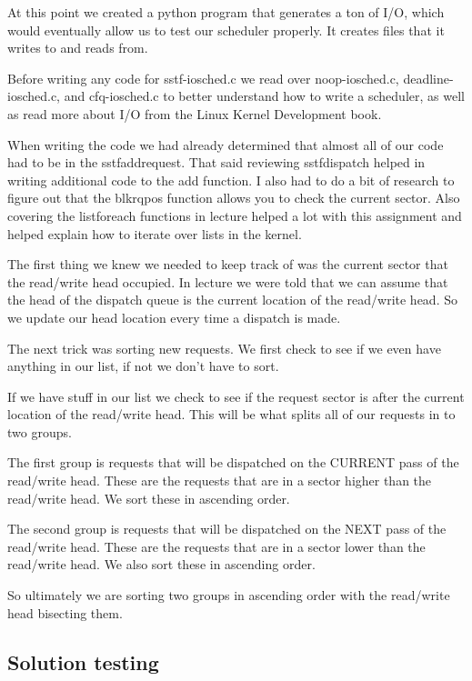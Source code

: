 \documentclass[journal,10pt,onecolumn,letterpaper,draftclsnofoot]{IEEEtran}
\begin{document}
At this point we created a python program that generates a ton of I/O, which would eventually allow us to test our scheduler properly. It creates files that it writes to and reads from.

Before writing any code for sstf-iosched.c we read over noop-iosched.c, deadline-iosched.c, and cfq-iosched.c to better understand how to write a scheduler, as well as read more about I/O from the Linux Kernel Development book.

When writing the code we had already determined that almost all of our code had to be in the sstf\textunderscore add\textunderscore request. That said reviewing sstf\textunderscore dispatch helped in writing additional code to the add function. I also had to do a bit of research to figure out that the blk\textunderscore rq\textunderscore pos function allows you to check the current sector. Also covering the list\textunderscore for\textunderscore each functions in lecture helped a lot with this assignment and helped explain how to iterate over lists in the kernel.

The first thing we knew we needed to keep track of was the current sector that the read/write head occupied. In lecture we were told that we can assume that the head of the dispatch queue is the current location of the read/write head. So we update our head location every time a dispatch is made.

The next trick was sorting new requests. We first check to see if we even have anything in our list, if not we don't have to sort.

If we have stuff in our list we check to see if the request sector is after the current location of the read/write head. This will be what splits all of our requests in to two groups.

The first group is requests that will be dispatched on the CURRENT pass of the read/write head. These are the requests that are in a sector higher than the read/write head. We sort these in ascending order.

The second group is requests that will be dispatched on the NEXT pass of the read/write head. These are the requests that are in a sector lower than the read/write head. We also sort these in ascending order.

So ultimately we are sorting two groups in ascending order with the read/write head bisecting them.

\subsection{Solution testing}
\end{document}
